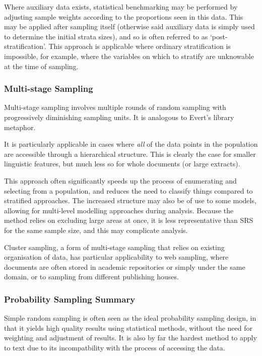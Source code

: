 Where auxiliary data exists, statistical benchmarking may be performed by adjusting sample weights according to the proportions seen in this data.  This may be applied after sampling itself (otherwise said auxiliary data is simply used to determine the initial strata sizes), and so is often referred to as `post-stratification'.  This approach is applicable where ordinary stratification is impossible, for example, where the variables on which to stratify are unknowable at the time of sampling.



\subsubsection{Multi-stage Sampling}
Multi-stage sampling involves multiple rounds of random sampling with progressively diminishing sampling units.  It is analogous to Evert's library metaphor\cite{evert2006random}.

It is particularly applicable in cases where \textsl{all} of the data points in the population are accessible through a hierarchical structure.  This is clearly the case for smaller linguistic features, but much less so for whole documents (or large extracts).

This approach often significantly speeds up the process of enumerating and selecting from a population, and reduces the need to classify things compared to stratified approaches.  The increased structure may also be of use to some models, allowing for multi-level modelling approaches during analysis.  Because the method relies on excluding large areas at once, it is less representative than SRS for the same sample size, and this may complicate analysis.

Cluster sampling, a form of multi-stage sampling that relies on existing organisation of data, has particular applicability to web sampling, where documents are often stored in academic repositories or simply under the same domain, or to sampling from different publishing houses.

\subsubsection{Probability Sampling Summary}
Simple random sampling is often seen as the ideal probability sampling design, in that it yields high quality results using statistical methods, without the need for weighting and adjustment of results.  It is also by far the hardest method to apply to text due to its incompatbility with the process of accessing the data.

